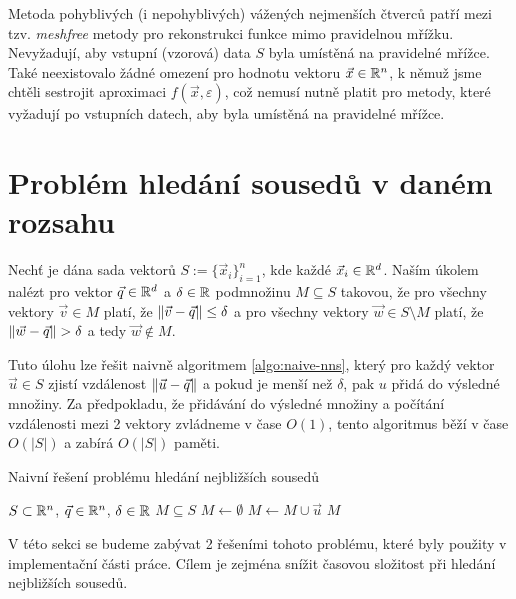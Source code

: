 Metoda pohyblivých (i nepohyblivých) vážených nejmenších čtverců patří mezi tzv. \textit{meshfree} metody pro rekonstrukci funkce mimo pravidelnou mřížku. Nevyžadují, aby vstupní (vzorová) data $S$ byla umístěná na pravidelné mřížce. Také neexistovalo žádné omezení pro hodnotu vektoru $\vec{x} \in \mathbb{R}^n$, k němuž jsme chtěli sestrojit aproximaci $f(\vec{x}, \varepsilon)$, což nemusí nutně platit pro metody, které vyžadují po vstupních datech, aby byla umístěná na pravidelné mřížce.

\section{Problém hledání sousedů v daném rozsahu}

\begin{defi}
  \label{defi:nns}
  Nechť je dána sada vektorů $S := \{\vec{x}_i\}_{i = 1}^n$, kde každé $\vec{x}_i \in \mathbb{R}^d$. Naším úkolem nalézt pro vektor $\vec{q} \in \mathbb{R}^d$ a $\delta \in \mathbb{R}$ podmnožinu $M \subseteq S$ takovou, že pro všechny vektory $\vec{v} \in M$ platí, že $\|\vec{v} - \vec{q}\| \leq \delta$ a pro všechny vektory $\vec{w} \in S \setminus M$ platí, že $\|\vec{w} - \vec{q}\| > \delta$ a tedy $\vec{w} \not\in M$.
\end{defi}

Tuto úlohu lze řešit naivně algoritmem \ref{algo:naive-nns}, který pro každý vektor $\vec{u} \in S$ zjistí vzdálenost $\|\vec{u} - \vec{q}\|$ a pokud je menší než $\delta$, pak $u$ přidá do výsledné množiny. Za předpokladu, že přidávání do výsledné množiny a počítání vzdálenosti mezi 2 vektory zvládneme v čase $O(1)$, tento algoritmus běží v čase $O(|S|)$ a zabírá $O(|S|)$ paměti.

\begin{algorithm}[ht!]
  \caption{Naivní řešení problému hledání nejbližších sousedů}
  \label{algo:naive-nns}
  \begin{algorithmic}
    \REQUIRE $S \subset \mathbb{R}^n$, $\vec{q} \in \mathbb{R}^n$, $\delta \in \mathbb{R}$
    \ENSURE $M \subseteq S$
    \STATE $M \leftarrow \emptyset$
          \STATE $M \leftarrow M \cup \vec{u}$
        \ENDIF
    \ENDFOR
    \RETURN $M$
  \end{algorithmic}
\end{algorithm}

V této sekci se budeme zabývat 2 řešeními tohoto problému, které byly použity v implementační části práce. Cílem je zejména snížit časovou složitost při hledání nejbližších sousedů.

